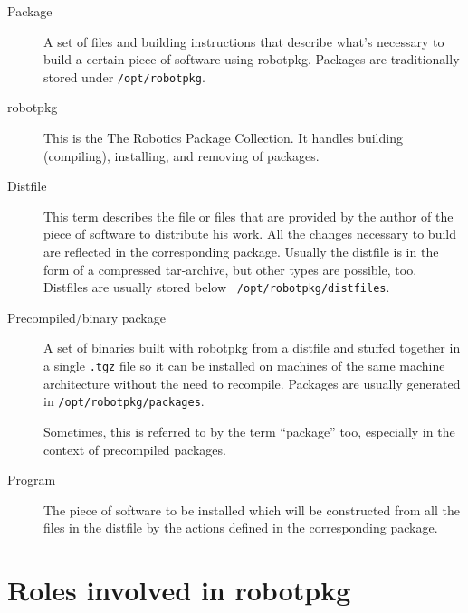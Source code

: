 \begin{description}
   \item[Package] A set of files and building instructions that describe what's
   necessary to build a certain piece  of software using robotpkg. Packages are
   traditionally stored under {\tt /opt/robotpkg}.

   \item[robotpkg]  This is  the The Robotics   Package Collection.  It handles
   building (compiling), installing, and removing of packages.

   \item[Distfile] This  term describes the file  or files that are provided by
   the author of the piece of software to distribute  his work. All the changes
   necessary to  build are reflected  in the corresponding package. Usually the
   distfile is in  the form of a  compressed  tar-archive, but other  types are
   possible,     too.    Distfiles   are      usually   stored    below    {\tt
   /opt/robotpkg/distfiles}.

   \item[Precompiled/binary package] A set of binaries built with robotpkg from
   a distfile  and stuffed together in a  single {\tt .tgz} file   so it can be
   installed  on machines of the same  machine architecture without the need to
   recompile. Packages are usually generated in {\tt /opt/robotpkg/packages}.

   Sometimes, this is  referred to by the  term ``package''  too, especially in
   the context of precompiled packages.

   \item[Program]  The  piece  of  software to  be  installed  which  will   be
   constructed from all the files in the distfile by the actions defined in the
   corresponding package.

\end{description}


\section{Roles involved in robotpkg} %

